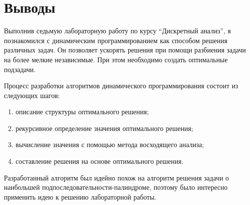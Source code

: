  
\section{Выводы}
Выполнив седьмую лабораторную работу по курсу \enquote{Дискретный анализ}, я познакомился с динамическим программированием как способом решения различных задач. Он позволяет ускорять решения при помощи разбиения задачи на более мелкие независимые. При этом необходимо создать оптимальные подзадачи.

Процесс разработки алгоритмов динамического программирования состоит из следующих шагов:
\begin{enumerate}
	\item описание структуры оптимального решения;
	\item рекурсивное определение значения оптимального решения;
	\item вычисление значения с помощью метода восходящего анализа;
	\item составление решения на основе оптимального решения.
\end{enumerate}

Разработанный алгоритм был идейно похож на алгоритм решения задачи о наибольшей подпоследовательности-палиндроме, поэтому было интересно применить идею к решению лабораторной работы.
\pagebreak
